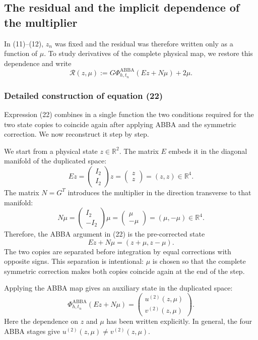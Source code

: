 \documentclass[11pt,a4paper]{article}
\newcommand{\R}{\mathbb{R}}
\newcommand{\Id}{I}
\newcommand{\PhiAB}{\Phi^{\mathrm{ABBA}}_{h,t_n}}
\begin{document}
\subsection{The residual and the implicit dependence of the multiplier}

In (11)--(12), $z_n$ was fixed and the residual was therefore written only as a function
of $\mu$. To study derivatives of the complete physical map, we restore this dependence
and write
\[
 \boxed{
 \mathcal R(z,\mu)
 :=G\PhiAB(Ez+N\mu)+2\mu.
 } \tag{22}
\]

\subsubsection*{Detailed construction of equation (22)}

Expression (22) combines in a single function the two conditions required for the two
state copies to coincide again after applying ABBA and the symmetric correction. We now
reconstruct it step by step.

We start from a physical state $z\in\R^2$. The matrix $E$ embeds it in the diagonal
manifold of the duplicated space:
\[
 Ez=
 \begin{pmatrix}\Id_2\\ \Id_2\end{pmatrix}z
 =\begin{pmatrix}z\\z\end{pmatrix}
 =(z,z)\in\R^4.
\]
The matrix $N=G^T$ introduces the multiplier in the direction transverse to that manifold:
\[
 N\mu=
 \begin{pmatrix}\Id_2\\-\Id_2\end{pmatrix}\mu
 =\begin{pmatrix}\mu\\-\mu\end{pmatrix}
 =(\mu,-\mu)\in\R^4.
\]
Therefore, the ABBA argument in (22) is the pre-corrected state
\[
 Ez+N\mu=(z+\mu,z-\mu).
\]
The two copies are separated before integration by equal corrections with opposite signs.
This separation is intentional: $\mu$ is chosen so that the complete symmetric correction
makes both copies coincide again at the end of the step.

Applying the ABBA map gives an auxiliary state in the duplicated space:
\[
 \PhiAB(Ez+N\mu)
 =\begin{pmatrix}u^{(2)}(z,\mu)\\v^{(2)}(z,\mu)\end{pmatrix}.
\]
Here the dependence on $z$ and $\mu$ has been written explicitly. In general, the four
ABBA stages give
$u^{(2)}(z,\mu)\neq v^{(2)}(z,\mu)$.
\end{document}
